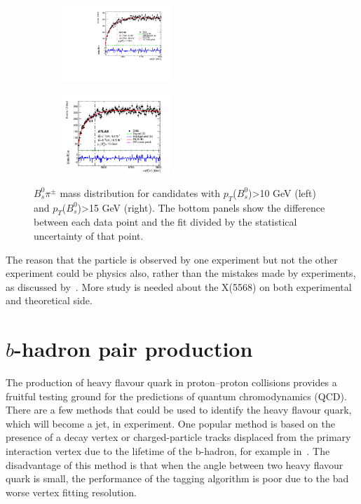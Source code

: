 \documentclass[epj]{webofc}
\begin{document}
\begin{figure}
    \centering
    \begin{subfigure}[H]{0.45\textwidth}
        \includegraphics[width=0.45\textwidth, natwidth=610,natheight=500]{plots/5568/fig_02a.pdf}
    \end{subfigure}
    \begin{subfigure}[H]{0.45\textwidth}
        \includegraphics[width=0.45\textwidth, natwidth=610,natheight=500]{plots/5568/fig_02b.png}
    \end{subfigure}
    \caption{$B_{s}^{0}\pi^{\pm}$ mass distribution for candidates with $p_T$($B_{s}^{0}$)>10 GeV (left) and $p_T$($B_{s}^{0}$)>15 GeV (right). 
     The bottom panels show the difference between each data point and the fit divided by the statistical uncertainty of that point.}
    \label{fig:55682}
\end{figure}

The reason that the particle is observed by one experiment but not the other experiment could be physics also, rather than the mistakes
made by experiments, as discussed by~\cite{Yang:2016sws}\cite{Ke:2018stp}. More study is needed about the X(5568) on both experimental and theoretical side. 


\section{$b$-hadron pair production}

The production of heavy flavour quark in proton–proton collisions provides a fruitful testing ground for the predictions of quantum chromodynamics (QCD).
There are a few methods that could be used to identify the heavy flavour quark, which will become a jet, in experiment. 
One popular method is based on the presence of a decay vertex or charged-particle tracks displaced from the primary interaction vertex 
due to the lifetime of the b-hadron, for example in~\cite{Aaboud:2016jed}. The disadvantage of this method is that when the angle
between two heavy flavour quark is small, the performance of the tagging algorithm is poor due to the bad worse vertex fitting resolution. 
\end{document}
